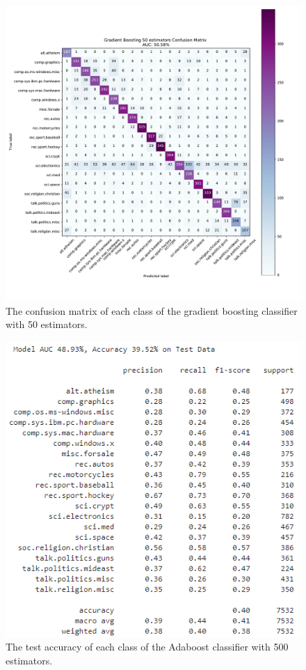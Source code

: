 \documentclass[twocolumn]{extarticle}
\begin{document}
\begin{appendices}
\begin{figure}[H]
\centering
\includegraphics[width=0.9\linewidth]{"charts/Gradient Boosting 50 estimators"}
\caption{The confusion matrix of each class of the gradient boosting classifier with 50 estimators.}
\label{chart:gb-50-conf}
\end{figure}

\begin{figure}[H]
\centering
\includegraphics[width=0.9\linewidth]{charts/ada-500-acc}
\caption{The test accuracy of each class of the Adaboost classifier with 500 estimators.}
\label{chart:ada-500-acc}
\end{figure}


\end{appendices}
\end{document}
